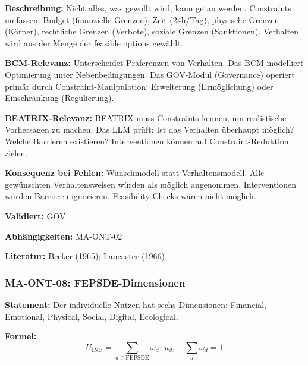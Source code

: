 \textbf{Beschreibung:}
Nicht alles, was gewollt wird, kann getan werden. Constraints umfassen: Budget (finanzielle Grenzen), Zeit (24h/Tag), physische Grenzen (Körper), rechtliche Grenzen (Verbote), soziale Grenzen (Sanktionen). Verhalten wird aus der Menge der feasible options gewählt.

\textbf{BCM-Relevanz:}
Unterscheidet Präferenzen von Verhalten. Das BCM modelliert Optimierung unter Nebenbedingungen. Das GOV-Modul (Governance) operiert primär durch Constraint-Manipulation: Erweiterung (Ermöglichung) oder Einschränkung (Regulierung).

\textbf{BEATRIX-Relevanz:}
BEATRIX muss Constraints kennen, um realistische Vorhersagen zu machen. Das LLM prüft: Ist das Verhalten überhaupt möglich? Welche Barrieren existieren? Interventionen können auf Constraint-Reduktion zielen.

\textbf{Konsequenz bei Fehlen:}
Wunschmodell statt Verhaltensmodell. Alle gewünschten Verhaltensweisen würden als möglich angenommen. Interventionen würden Barrieren ignorieren. Feasibility-Checks wären nicht möglich.

\textbf{Validiert:} GOV

\textbf{Abhängigkeiten:} MA-ONT-02

\textbf{Literatur:} Becker (1965); Lancaster (1966)



\subsubsection*{MA-ONT-08: FEPSDE-Dimensionen}

\textbf{Statement:} Der individuelle Nutzen hat sechs Dimensionen: Financial, Emotional, Physical, Social, Digital, Ecological.

\textbf{Formel:}
\begin{equation}
U_{\text{INU}} = \sum_{d \in \text{FEPSDE}} \omega_d \cdot u_d, \quad \sum_d \omega_d = 1
\end{equation}

